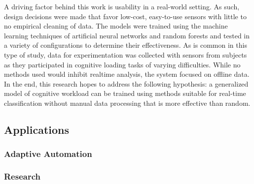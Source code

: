 \documentclass[11pt]{article}
\begin{document}
A driving factor behind this work is usability in a real-world setting. As such, design decisions were made that favor low-cost, easy-to-use sensors with little to no empirical cleaning of data. The models were trained using the machine learning techniques of artificial neural networks and random forests and tested in a variety of configurations to determine their effectiveness. As is common in this type of study, data for experimentation was collected with sensors from subjects as they participated in cognitive loading tasks of varying difficulties. While no methods used would inhibit realtime analysis, the system focused on offline data.  In the end, this research hopes to address the following hypothesis: a generalized model of cognitive workload can be trained using methods suitable for real-time classification without manual data processing that is more effective than random.
	\subsection{Applications}
	
		\subsubsection{Adaptive Automation}
		
		\subsubsection{Research}
		
\end{document}
